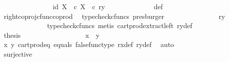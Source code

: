 \begin{isabellebody}
\ \ \ \ \ \ \ \ \ \ \isamarkupfalse%
\ \isamarkupfalse%
\ {\isachardoublequoteopen}{\isachardot}{\kern0pt}{\isachardot}{\kern0pt}{\isachardot}{\kern0pt}\ {\isacharequal}{\kern0pt}\ {\isasymlangle}id\ X{\isacharcomma}{\kern0pt}\ {\isasymf}\ {\isasymcirc}\isactrlsub c\ {\isasymbeta}\isactrlbsub X\isactrlesub {\isasymrangle}\ \ {\isasymcirc}\isactrlsub c\ ry{\isachardoublequoteclose}\isanewline
\ \ \ \ \ \ \ \ \ \ \ \ \isamarkupfalse%
\ {\isasymrho}{\isacharunderscore}{\kern0pt}def\ \ \isamarkupfalse%
\ right{\isacharunderscore}{\kern0pt}coproj{\isacharunderscore}{\kern0pt}cfunc{\isacharunderscore}{\kern0pt}coprod\ \isamarkupfalse%
\ {\isacharparenleft}{\kern0pt}typecheck{\isacharunderscore}{\kern0pt}cfuncs{\isacharcomma}{\kern0pt}\ presburger{\isacharparenright}{\kern0pt}\isanewline
\ \ \ \ \ \ \ \ \ \ \isamarkupfalse%
\ \isamarkupfalse%
\ {\isachardoublequoteopen}{\isachardot}{\kern0pt}{\isachardot}{\kern0pt}{\isachardot}{\kern0pt}\ {\isacharequal}{\kern0pt}\ {\isasymlangle}ry{\isacharcomma}{\kern0pt}\ {\isasymf}{\isasymrangle}{\isachardoublequoteclose}\isanewline
\ \ \ \ \ \ \ \ \ \ \ \ \isamarkupfalse%
\ {\isacharparenleft}{\kern0pt}typecheck{\isacharunderscore}{\kern0pt}cfuncs{\isacharcomma}{\kern0pt}\ metis\ cart{\isacharunderscore}{\kern0pt}prod{\isacharunderscore}{\kern0pt}extract{\isacharunderscore}{\kern0pt}left\ ry{\isacharunderscore}{\kern0pt}def{\isacharparenright}{\kern0pt}\isanewline
\ \ \ \ \ \ \ \ \ \ \isamarkupfalse%
\ \isamarkupfalse%
\ {\isacharquery}{\kern0pt}thesis\isacommand{{\isachardot}{\kern0pt}}\isamarkupfalse%
\isanewline
\ \ \ \ \ \ \ \ \isamarkupfalse%
\isanewline
\ \ \ \ \ \ \ \ \isamarkupfalse%
\ {\isachardoublequoteopen}x\ {\isacharequal}{\kern0pt}\ y{\isachardoublequoteclose}\isanewline
\ \ \ \ \ \ \ \ \ \ \isamarkupfalse%
\ {\isasymrho}x\ {\isasymrho}y\ cart{\isacharunderscore}{\kern0pt}prod{\isacharunderscore}{\kern0pt}eq{}\ equals\ false{\isacharunderscore}{\kern0pt}func{\isacharunderscore}{\kern0pt}type\ rx{\isacharunderscore}{\kern0pt}def\ ry{\isacharunderscore}{\kern0pt}def\ \isamarkupfalse%
\ auto\isanewline
\ \ \ \ \ \ \isamarkupfalse%
\isanewline
\ \ \ \ \isamarkupfalse%
\isanewline
\ \ \isamarkupfalse%
\isanewline
\ \ \isamarkupfalse%
\ {\isachardoublequoteopen}surjective\ {\isasymrho}{\isachardoublequoteclose}\isanewline

\end{isabellebody}
